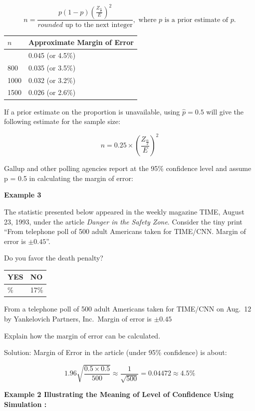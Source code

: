 \documentclass[
]{book}
\begin{document}
\[
n = \frac{p(1-p) \left( \frac{Z_{\frac{\alpha}{2}}}{E} \right)^2}{rounded \text{ up to the next integer}}, \text{ where } p \text{ is a prior estimate of } p.
\]

\begin{longtable}[]{@{}ll@{}}
\toprule\noalign{}
\(n\) & Approximate Margin of Error \\
\midrule\noalign{}
\endhead
\bottomrule\noalign{}
\endlastfoot
500 & 0.045 (or 4.5\%) \\
800 & 0.035 (or 3.5\%) \\
1000 & 0.032 (or 3.2\%) \\
1500 & 0.026 (or 2.6\%) \\
\end{longtable}

If a prior estimate on the proportion is unavailable, using \(\hat{p} = 0.5\) will give the following estimate for the sample size:

\[
n = 0.25 \times \left( \frac{Z_{\frac{\alpha}{2}}}{E} \right)^2
\]

Gallup and other polling agencies report at the 95\% confidence level and assume p = 0.5 in calculating the margin of error:

\textbf{Example 3}

The statistic presented below appeared in the weekly magazine TIME, August 23, 1993, under the article \emph{Danger in the Safety Zone}. Consider the tiny print ``From telephone poll of 500 adult Americans taken for TIME/CNN. Margin of error is \(\pm 0.45\)''.

Do you favor the death penalty?

\begin{longtable}[]{@{}ll@{}}
\toprule\noalign{}
YES & NO \\
\midrule\noalign{}
\endhead
\bottomrule\noalign{}
\endlastfoot
77\% & 17\% \\
\end{longtable}

From a telephone poll of 500 adult Americans taken for TIME/CNN on Aug.~12 by Yankelovich Partners, Inc.~Margin of error is \(\pm 0.45\)

Explain how the margin of error can be calculated.

Solution: Margin of Error in the article (under 95\% confidence) is about:

\[
1.96 \sqrt{\frac{0.5 \times 0.5}{500}} \approx \frac{1}{\sqrt{500}} = 0.04472 \approx 4.5\%
\]

\textbf{Example 2 Illustrating the Meaning of Level of Confidence Using Simulation :}
\end{document}
